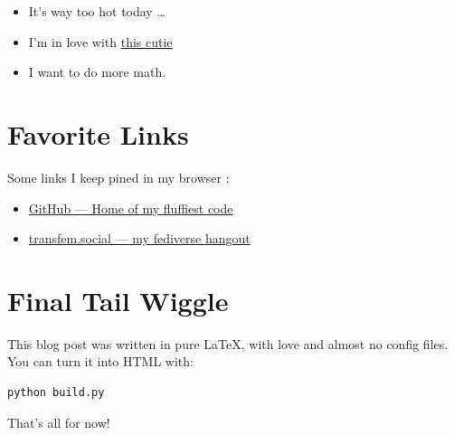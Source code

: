 \documentclass{article}
\begin{document}
\begin{itemize}
  \item It's way too hot today \ldots
  \item I'm in love with \href{https://github.com/Sigmanificient}{this cutie}
  \item I want to do more math.
\end{itemize}

\section*{Favorite Links}

Some links I keep pined in my browser :

\begin{itemize}
  \item \href{https://github.com/Jaggernaute}{GitHub — Home of my
    fluffiest code}
  \item \href{https://transfem.social/@jaggi}{transfem.social — my
    fediverse hangout}
\end{itemize}

\section*{Final Tail Wiggle}

This blog post was written in pure LaTeX, with love and almost no config files.
You can turn it into HTML with:

\begin{verbatim}
python build.py
\end{verbatim}

That’s all for now!
\end{document}
